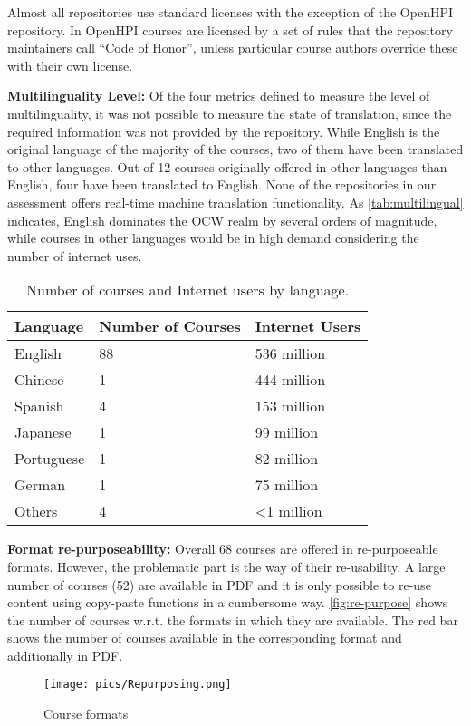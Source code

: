 \documentclass{sig-alternate}
\let\ednote\Ednote
\theoremstyle{definition}
\begin{document}
Almost all repositories use standard licenses with the exception of the OpenHPI repository.
In OpenHPI courses are licensed by a set of rules that the repository maintainers call ``Code of Honor'', unless particular course authors override these with their own license.

\noindent\textbf{Multilinguality Level:}
Of the four metrics defined to measure the level of multilinguality, it was not possible to measure \ednote{refer to the metric}the state of translation, since the required information was not provided by the repository.
While English is the original language of the majority of the courses, two of them have been translated to other languages.
Out of 12 courses originally offered in other languages than English, four have been translated to English.
None of the repositories in our assessment offers real-time machine translation functionality.
As \autoref{tab:multilingual} indicates, English dominates the OCW realm by several orders of magnitude, while courses in other languages would be in high demand considering the number of internet uses.

\begin{table}[ht]
\begin{tabular}{p{.15\linewidth}p{.32\linewidth}p{.42\linewidth}}
\hline
\textbf{Language} & \textbf{Number of Courses} & \textbf{Internet Users} \\ \hline
English & 88 & 536 million \\
Chinese & 1 & 444 million \\
Spanish & 4 & 153 million \\
Japanese & 1 & 99 million \\
Portuguese & 1 & 82 million \\
German & 1 & 75 million \\
Others & 4 & <1 million \\
\end{tabular}
\caption{Number of courses and Internet users by language.}
\label{tab:multilingual}
\end{table}
 


\noindent\textbf{Format re-purposeability:}
Overall 68 courses are offered in re-purposeable formats.
However, the problematic part is the way of their re-usability.
A large number of courses (52) are available in PDF and it is only possible to re-use content using copy-paste functions in a cumbersome way.
\autoref{fig:re-purpose} shows the number of courses w.r.t. the formats in which they are available.
The red bar shows the number of courses available in the corresponding format and additionally in PDF.
\begin{figure}[h]
\texttt{[image: pics/Repurposing.png]}
\caption{Course formats}\label{fig:re-purpose}
\end{figure}
\end{document}
